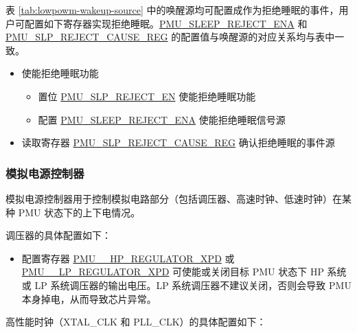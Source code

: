 \documentclass[main\_\_CN.tex]{subfiles}
\begin{document}
表 \ref{tab:lowpowm-wakeup-source} 中的唤醒源均可配置成作为拒绝睡眠的事件，用户可配置如下寄存器实现拒绝睡眠。\hyperref[fielddesc:PMUSLEEPREJECTENA]{PMU\_SLEEP\_REJECT\_ENA} 和 \hyperref[fielddesc:PMUREJECTCAUSE]{PMU\_SLP\_REJECT\_CAUSE\_REG} 的配置值与唤醒源的对应关系均与表中一致。

\begin{itemize}
    \item  使能拒绝睡眠功能
        \begin{itemize}
            \item 置位 \hyperref[fielddesc:PMUSLPREJECTEN]{PMU\_SLP\_REJECT\_EN} 使能拒绝睡眠功能
            \item 配置 \hyperref[fielddesc:PMUSLEEPREJECTENA]{PMU\_SLEEP\_REJECT\_ENA} 使能拒绝睡眠信号源
        \end{itemize}
    \item 读取寄存器 \hyperref[fielddesc:PMUREJECTCAUSE]{PMU\_SLP\_REJECT\_CAUSE\_REG} 确认拒绝睡眠的事件源
\end{itemize}

\subsubsection{模拟电源控制器}\label{sec:pmu_analog_power_controller}

模拟电源控制器用于控制模拟电路部分（包括调压器、高速时钟、低速时钟）在某种 PMU 状态下的上下电情况。

调压器的具体配置如下：

\begin{itemize}
    \item 配置寄存器 \hyperref[fielddesc:PMUHPACTIVEHPREGULATORXPD]{PMU\_\_HP\_REGULATOR\_XPD} 或 \hyperref[fielddesc:PMUHPSLEEPLPREGULATORXPD]{PMU\_\_LP\_REGULATOR\_XPD} 可使能或关闭目标 PMU 状态下 HP 系统或 LP 系统调压器的输出电压。LP 系统调压器不建议关闭，否则会导致 PMU 本身掉电，从而导致芯片异常。
\end{itemize}

高性能时钟（XTAL\_CLK 和 PLL\_CLK）的具体配置如下：
\end{document}
